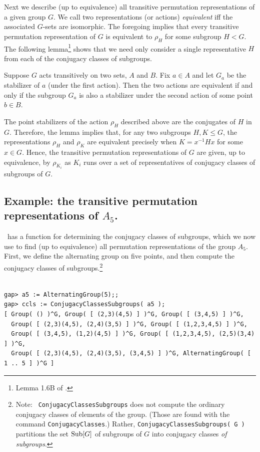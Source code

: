 Next we describe (up to equivalence) all transitive permutation
representations of a given group $G$.  
We call two representations (or actions) \emph{equivalent}
iff the associated $G$-sets are isomorphic. 
The foregoing implies that every transitive permutation representation of $G$ is
equivalent to $\rho_H$ for some subgroup $H < G$.  The following
lemma\footnote{Lemma 1.6B of \cite{Dixon:1996}.} 
shows that we need only consider a single representative $H$ from each of the
conjugacy classes of subgroups.  

\begin{lemma}
Suppose $G$ acts transitively on two sets,
$A$ and $B$.  Fix $a\in A$ and let $G_a$ be the stabilizer of $a$ (under the first
action).  Then the two actions are equivalent
if and only if the subgroup $G_a$ is also a stabilizer under the second action
of some point $b\in B$. 
\end{lemma}

The point stabilizers of the action $\rho_H$ described above are the
conjugates of $H$ in $G$.  Therefore, the lemma implies that, for any two
subgroups $H, K \leq G$, the representations $\rho_H$ and $\rho_K$ are
equivalent precisely when $K = x^{-1} Hx$ for some $x\in G$. 
Hence, the transitive permutation representations of $G$ are given, up to
equivalence, by $\rho_{K_i}$ as $K_i$ runs over a set of representatives of
conjugacy classes of subgroups of $G$.   




\subsection{Example:  the transitive permutation representations of $A_5$.}
\label{subsection-a5}
\gap\ has a function for determining the conjugacy classes of
subgroups, which we now use to find (up to equivalence) all permutation
representations of the group $A_5$.
First, we define the alternating group on five points, and then
compute the conjugacy classes of subgroups.\footnote{Note: {\tt
    ConjugacyClassesSubgroups} does not compute the ordinary conjugacy classes of
  elements of the group. (Those are found with the command {\tt ConjugacyClasses}.)
  Rather, {\tt ConjugacyClassesSubgroups( G )} partitions the set $\mathrm{Sub}[G]$ of
  subgroups of $G$ into conjugacy classes \emph{of subgroups}.} 

{\codesize 
\begin{verbatim}

gap> a5 := AlternatingGroup(5);;
gap> ccls := ConjugacyClassesSubgroups( a5 );
[ Group( () )^G, Group( [ (2,3)(4,5) ] )^G, Group( [ (3,4,5) ] )^G, 
  Group( [ (2,3)(4,5), (2,4)(3,5) ] )^G, Group( [ (1,2,3,4,5) ] )^G, 
  Group( [ (3,4,5), (1,2)(4,5) ] )^G, Group( [ (1,2,3,4,5), (2,5)(3,4) ] )^G, 
  Group( [ (2,3)(4,5), (2,4)(3,5), (3,4,5) ] )^G, AlternatingGroup( [ 1 .. 5 ] )^G ]

\end{verbatim}}

